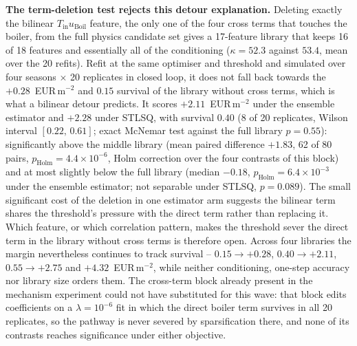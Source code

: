 \textbf{The term-deletion test rejects this detour explanation.} Deleting exactly the bilinear
$T_{\text{in}}u_{\text{Boil}}$ feature, the only one of the four cross terms that touches the boiler, from the full physics candidate set gives a 17-feature library
that keeps 16 of 18 features and essentially all of the conditioning
($\kappa = 52.3$ against $53.4$, mean over the 20 refits). Refit at the same
optimiser and threshold and simulated over four seasons $\times$ 20 replicates in
closed loop, it does not fall back towards the $+0.28$~EUR\,m$^{-2}$ and $0.15$
survival of the library without cross terms, which is what a bilinear detour
predicts. It scores $+2.11$~EUR\,m$^{-2}$ under the ensemble estimator and $+2.28$
under STLSQ, with survival $0.40$ (8 of 20 replicates, Wilson interval
$[0.22,\,0.61]$; exact McNemar test against the full library $p = 0.55$):
significantly above the middle library (mean paired difference $+1.83$, 62 of 80
pairs, $p_{\text{Holm}} = 4.4\times10^{-6}$, Holm correction over the four
contrasts of this block) and at most slightly below the full library (median
$-0.18$, $p_{\text{Holm}} = 6.4\times10^{-3}$ under the ensemble estimator; not
separable under STLSQ, $p = 0.089$). The small significant cost of the deletion in
one estimator arm suggests the bilinear term shares the threshold's pressure with
the direct term rather than replacing it. Which feature, or which correlation
pattern, makes the threshold sever the direct term in the library without cross
terms is therefore open. Across four libraries the margin nevertheless continues to track
survival -- $0.15 \rightarrow +0.28$, $0.40 \rightarrow +2.11$,
$0.55 \rightarrow +2.75$ and $+4.32$~EUR\,m$^{-2}$, while neither conditioning,
one-step accuracy nor library size orders them. The cross-term block already
present in the mechanism experiment could not have substituted for this wave: that
block edits coefficients on a $\lambda=10^{-6}$ fit in which the direct boiler term
survives in all 20 replicates, so the pathway is never severed by sparsification
there, and none of its contrasts reaches significance under either objective.


